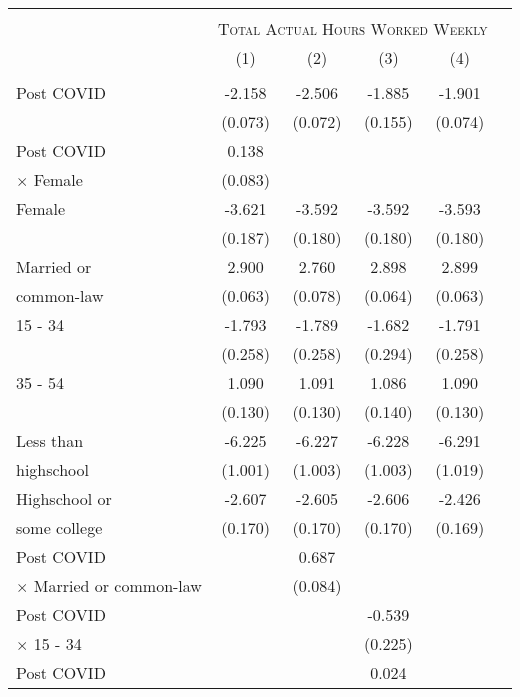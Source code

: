 \begin{tabular*}{\textwidth}{ @{\extracolsep{\fill}}l*{5}{c}}
\hline\hline
\\
& \multicolumn{4}{c}{ \textsc{Total Actual Hours Worked Weekly} } \\
                &\multicolumn{1}{c}{(1)}&\multicolumn{1}{c}{(2)}&\multicolumn{1}{c}{(3)}&\multicolumn{1}{c}{(4)}\\
\hline
\\
Post COVID      &   -2.158&   -2.506&   -1.885&   -1.901\\
                &  (0.073)&  (0.072)&  (0.155)&  (0.074)\\
[0.5em]
Post COVID      &    0.138&         &         &         \\
$\times$ Female &  (0.083)&         &         &         \\
[0.5em]
Female          &   -3.621&   -3.592&   -3.592&   -3.593\\
                &  (0.187)&  (0.180)&  (0.180)&  (0.180)\\
[0.5em]
Married or      &    2.900&    2.760&    2.898&    2.899\\
common-law      &  (0.063)&  (0.078)&  (0.064)&  (0.063)\\
[0.5em]
15 - 34         &   -1.793&   -1.789&   -1.682&   -1.791\\
                &  (0.258)&  (0.258)&  (0.294)&  (0.258)\\
[0.5em]
35 - 54         &    1.090&    1.091&    1.086&    1.090\\
                &  (0.130)&  (0.130)&  (0.140)&  (0.130)\\
[0.5em]
Less than       &   -6.225&   -6.227&   -6.228&   -6.291\\
highschool      &  (1.001)&  (1.003)&  (1.003)&  (1.019)\\
[0.5em]
Highschool or   &   -2.607&   -2.605&   -2.606&   -2.426\\
some college    &  (0.170)&  (0.170)&  (0.170)&  (0.169)\\
[0.5em]
Post COVID      &         &    0.687&         &         \\
$\times$ Married or common-law&         &  (0.084)&         &         \\
[0.5em]
Post COVID      &         &         &   -0.539&         \\
$\times$ 15 - 34&         &         &  (0.225)&         \\
[0.5em]
Post COVID      &         &         &    0.024&         \\

\end{tabular*}
